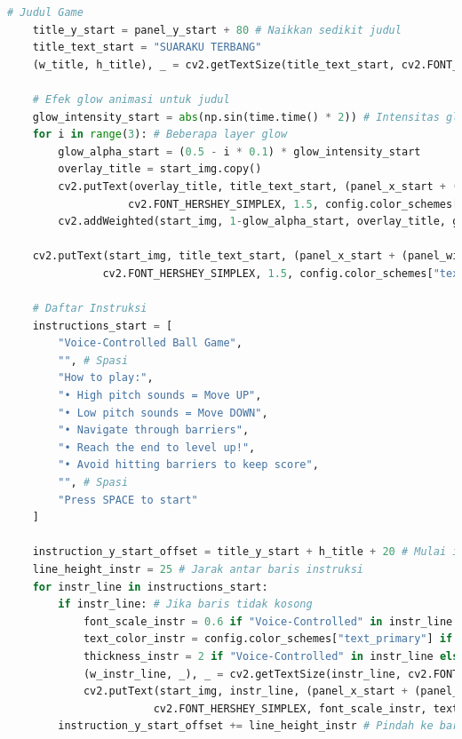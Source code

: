 \documentclass[11pt,a4paper]{article}
\begin{document}
\begin{itemize}
\begin{itemize}
\begin{itemize}
\begin{lstlisting}[language=Python, caption=Panel utama dan judul]
    # Judul Game
    title_y_start = panel_y_start + 80 # Naikkan sedikit judul
    title_text_start = "SUARAKU TERBANG"
    (w_title, h_title), _ = cv2.getTextSize(title_text_start, cv2.FONT_HERSHEY_SIMPLEX, 1.5, 3)
    
    # Efek glow animasi untuk judul
    glow_intensity_start = abs(np.sin(time.time() * 2)) # Intensitas glow berdenyut
    for i in range(3): # Beberapa layer glow
        glow_alpha_start = (0.5 - i * 0.1) * glow_intensity_start
        overlay_title = start_img.copy()
        cv2.putText(overlay_title, title_text_start, (panel_x_start + (panel_width_start - w_title) // 2, title_y_start), 
                   cv2.FONT_HERSHEY_SIMPLEX, 1.5, config.color_schemes["primary"], 4 + i*2) # Glow lebih tebal
        cv2.addWeighted(start_img, 1-glow_alpha_start, overlay_title, glow_alpha_start, 0, start_img)
    
    cv2.putText(start_img, title_text_start, (panel_x_start + (panel_width_start - w_title) // 2, title_y_start), 
               cv2.FONT_HERSHEY_SIMPLEX, 1.5, config.color_schemes["text_primary"], 3)
    
    # Daftar Instruksi
    instructions_start = [
        "Voice-Controlled Ball Game",
        "", # Spasi
        "How to play:",
        "• High pitch sounds = Move UP",
        "• Low pitch sounds = Move DOWN", 
        "• Navigate through barriers",
        "• Reach the end to level up!",
        "• Avoid hitting barriers to keep score",
        "", # Spasi
        "Press SPACE to start"
    ]
    
    instruction_y_start_offset = title_y_start + h_title + 20 # Mulai instruksi di bawah judul
    line_height_instr = 25 # Jarak antar baris instruksi
    for instr_line in instructions_start:
        if instr_line: # Jika baris tidak kosong
            font_scale_instr = 0.6 if "Voice-Controlled" in instr_line else 0.5
            text_color_instr = config.color_schemes["text_primary"] if "Voice-Controlled" in instr_line else config.color_schemes["text_secondary"]
            thickness_instr = 2 if "Voice-Controlled" in instr_line else 1
            (w_instr_line, _), _ = cv2.getTextSize(instr_line, cv2.FONT_HERSHEY_SIMPLEX, font_scale_instr, thickness_instr)
            cv2.putText(start_img, instr_line, (panel_x_start + (panel_width_start - w_instr_line) // 2, instruction_y_start_offset), 
                       cv2.FONT_HERSHEY_SIMPLEX, font_scale_instr, text_color_instr, thickness_instr)
        instruction_y_start_offset += line_height_instr # Pindah ke baris berikutnya
    

\end{lstlisting}
\end{itemize}
\end{itemize}
\end{itemize}
\end{document}

